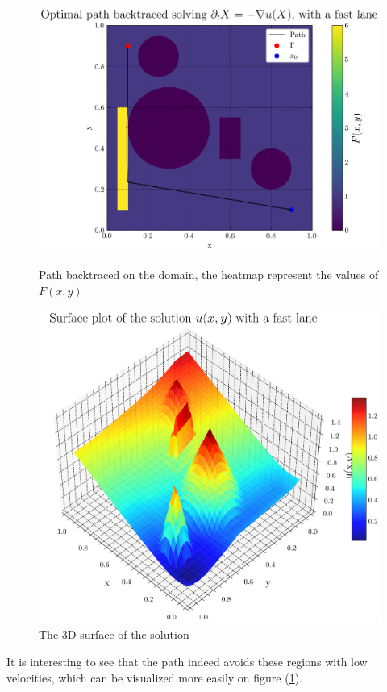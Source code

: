 \documentclass[11pt]{article}
\theoremstyle{definition}
\theoremstyle{remark}
\begin{document}
\FloatBarrier

\begin{figure}[h]
  \centering
  \begin{minipage}{0.45\textwidth}
    \centering
    \includegraphics[width=\textwidth]{plots/path_mountain_fast_lane.png}
    \caption{Path backtraced on the domain, the heatmap represent the values of $F(x,y)$}
  \end{minipage}
  \hfill
  \begin{minipage}{0.45\textwidth}
    \centering
    \includegraphics[width=\textwidth]{plots/surface_mountain_fast_lane.png}
    \caption{The 3D surface of the solution}
    \label{3d_surface_mountain}
  \end{minipage}
\end{figure}

\noindent It is interesting to see that the path indeed avoids these regions with low velocities, which can be visualized more easily on figure (\ref{3d_surface_mountain}).
\end{document}
